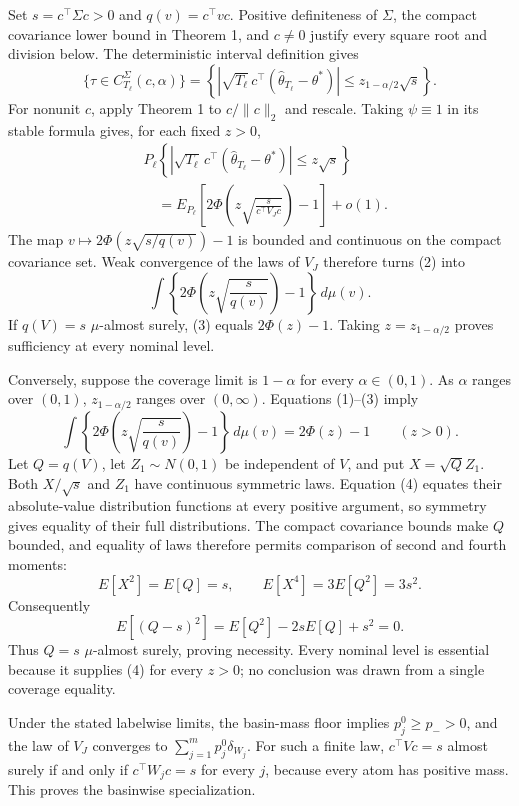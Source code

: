 Set \(s=c^\top\Sigma c>0\) and \(q(v)=c^\top vc\). Positive definiteness of \(\Sigma\), the compact covariance lower bound in Theorem 1, and \(c\ne0\) justify every square root and division below. The deterministic interval definition gives
\[
 \{\tau\in C_{T_\ell}^{\Sigma}(c,\alpha)\}
 =\left\{\left|\sqrt{T_\ell}\,c^\top(\widehat\theta_{T_\ell}-\theta^*)\right|
 \le z_{1-\alpha/2}\sqrt s\right\}. \tag{1}
\]
For nonunit \(c\), apply Theorem 1 to \(c/\|c\|_2\) and rescale. Taking \(\psi\equiv1\) in its stable formula gives, for each fixed \(z>0\),
\[
\begin{aligned}
 &P_\ell\!\left\{\left|\sqrt{T_\ell}\,c^\top
 (\widehat\theta_{T_\ell}-\theta^*)\right|\le z\sqrt s\right\}\\
 &\quad=E_{P_\ell}\!\left[2\Phi\!\left(z\sqrt{\frac{s}{c^\top V_Jc}}\right)-1\right]+o(1). \tag{2}
\end{aligned}
\]
The map \(v\mapsto2\Phi(z\sqrt{s/q(v)})-1\) is bounded and continuous on the compact covariance set. Weak convergence of the laws of \(V_J\) therefore turns (2) into
\[
 \int\left\{2\Phi\!\left(z\sqrt{\frac{s}{q(v)}}\right)-1\right\}\,d\mu(v). \tag{3}
\]
If \(q(V)=s\) \(\mu\)-almost surely, (3) equals \(2\Phi(z)-1\). Taking \(z=z_{1-\alpha/2}\) proves sufficiency at every nominal level.

Conversely, suppose the coverage limit is \(1-\alpha\) for every \(\alpha\in(0,1)\). As \(\alpha\) ranges over \((0,1)\), \(z_{1-\alpha/2}\) ranges over \((0,\infty)\). Equations (1)--(3) imply
\[
 \int\left\{2\Phi\!\left(z\sqrt{\frac{s}{q(v)}}\right)-1\right\}\,d\mu(v)
 =2\Phi(z)-1\qquad(z>0). \tag{4}
\]
Let \(Q=q(V)\), let \(Z_1\sim N(0,1)\) be independent of \(V\), and put \(X=\sqrt QZ_1\). Both \(X/\sqrt s\) and \(Z_1\) have continuous symmetric laws. Equation (4) equates their absolute-value distribution functions at every positive argument, so symmetry gives equality of their full distributions. The compact covariance bounds make \(Q\) bounded, and equality of laws therefore permits comparison of second and fourth moments:
\[
 E[X^2]=E[Q]=s,
 \qquad E[X^4]=3E[Q^2]=3s^2. \tag{5}
\]
Consequently
\[
 E[(Q-s)^2]=E[Q^2]-2sE[Q]+s^2=0. \tag{6}
\]
Thus \(Q=s\) \(\mu\)-almost surely, proving necessity. Every nominal level is essential because it supplies (4) for every \(z>0\); no conclusion was drawn from a single coverage equality.

Under the stated labelwise limits, the basin-mass floor implies \(p_j^0\ge p_->0\), and the law of \(V_J\) converges to \(\sum_{j=1}^mp_j^0\delta_{W_j}\). For such a finite law, \(c^\top Vc=s\) almost surely if and only if \(c^\top W_jc=s\) for every \(j\), because every atom has positive mass. This proves the basinwise specialization.
